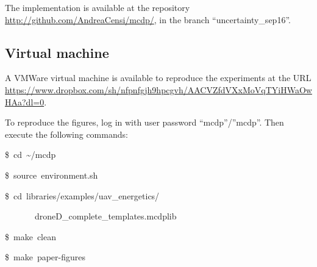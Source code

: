\documentclass[twocolumn,english]{IEEEconf}
\theoremstyle{plain}
\theoremstyle{definition}
\theoremstyle{definition}
\theoremstyle{plain}
\newenvironment{lyxcode}
{\par\begin{list}{}{
\setlength{\rightmargin}{\leftmargin}
\setlength{\listparindent}{0pt}
\raggedright
\setlength{\itemsep}{0pt}
\setlength{\parsep}{0pt}
\normalfont\ttfamily}
 \item[]}
{\end{list}}
\begin{document}
The implementation is available at the repository \url{http://github.com/AndreaCensi/mcdp/},
in the branch ``uncertainty\_sep16''. 

\subsection{Virtual machine }

A VMWare virtual machine is available to reproduce the experiments
at the URL \url{https://www.dropbox.com/sh/nfpnfgjh9hpcgvh/AACVZfdVXxMoVqTYiHWaOwHAa?dl=0}.

To reproduce the figures, log in with user password ``mcdp''/''mcdp''.
Then execute the following commands:

\footnotesize
\begin{lyxcode}
\$~cd~\textasciitilde{}/mcdp

\$~source~environment.sh

\$~cd~libraries/examples/uav\_energetics/

~~~~~~~droneD\_complete\_templates.mcdplib

\$~make~clean

\$~make~paper-figures
\end{lyxcode}

\clearpage

 
\end{document}
